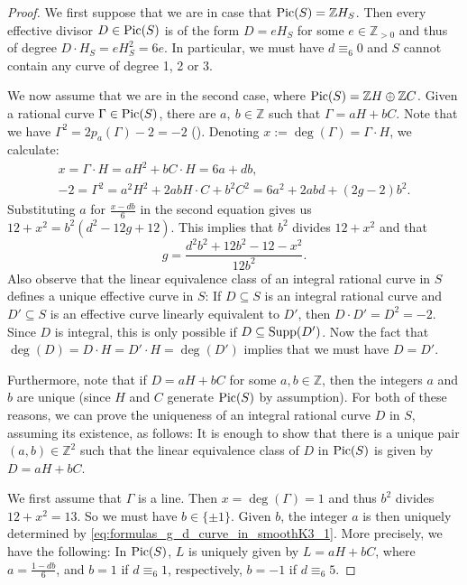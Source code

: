 \documentclass[english,11pt,reqno]{amsart}
\newcommand{\sub}{\subseteq}
\newcommand{\Z}{\mathbb{Z}}
\newcommand{\Pic}{\textup{Pic}}
\newcommand{\supp}{\textup{Supp}}
\begin{document}
%
\begin{proof}
We first suppose that we are in case that $\Pic(S)=\Z H_S$. Then every effective divisor $D\in\Pic(S)$ is of the form $D=eH_S$ for some $e\in \Z_{>0}$ and thus of degree $D\cdot H_S=eH_S^2=6e$. In particular, we must have $d\equiv_6 0$ and $S$ cannot contain any curve of degree 1, 2 or 3. \par 
We now assume that we are in the second case, where $\Pic(S)=\Z H\oplus \Z C$. Given a rational curve $\Gamma \in \Pic(S)$, there are $a,\:b\in \Z$ such that $\Gamma=aH+bC$. Note that we have $\Gamma^2 =2p_a(\Gamma)-2=-2$ (). Denoting $x:=\deg(\Gamma)=\Gamma\cdot H$, we calculate: 
\begin{gather*} \label{eq:formulas_g_d_curve_in_smoothK3_1}
x = \Gamma \cdot H = a H^2 + b C\cdot H = 6a + db, \tag{$\triangle_1$}\\
-2 = \Gamma^2 = a^2 H^2+ 2abH\cdot C + b^2 C^2= 6a^2 + 2abd + (2g-2)b^2. \nonumber
\end{gather*}
Substituting $a$ for $\frac{x-db}{6}$ in the second equation gives us
$12+x^2=b^2(d^2-12g+12)$. This implies that $ b^2$ divides $12+x^2$ and that \begin{equation} \label{eq:formulas_g_d_curve_in_smoothK3_2}
g =\frac{d^2b^2+12b^2-12-x^2}{12b^2}. \tag{$\triangle_2$}
\end{equation}
Also observe that the linear equivalence class of an integral rational curve in $S$ defines a unique effective curve in $S$: If $D\sub S$ is an integral rational curve and $D'\sub S$ is an effective curve linearly equivalent to $D'$, then $D\cdot D'=D^2=-2$. Since $D$ is integral, this is only possible if $D\sub \supp(D')$. Now the fact that $\deg(D)=D\cdot H=D'\cdot H=\deg(D')$ implies that we must have $D=D'$.   \par
Furthermore, note that if $D=aH+bC$ for some $a,b\in \Z$, then the integers $a$ and $b$ are unique (since $H$ and $C$ generate $\Pic(S)$ by assumption). For both of these reasons, we can prove the uniqueness of an integral rational curve $D$ in $S$, assuming its existence, as follows: It is enough to show that there is a unique pair $(a,b)\in \Z^2$ such that the linear equivalence class of $D$ in $\Pic(S)$ is given by $D=aH+bC$. \par 
We first assume that $\Gamma$ is a line. Then $x=\deg(\Gamma)=1$ and thus $b^2$ divides $12+x^2=13$. So we must have $b\in\{\pm1\}$. Given $b$, the integer $a$ is then uniquely determined by \eqref{eq:formulas_g_d_curve_in_smoothK3_1}. More precisely, we have the following: In $\Pic(S)$, $L$ is uniquely given by $L=aH+bC$, where $a=\frac{1-db}{6}$, and $b=1$ if $d\equiv_6 1$, respectively, $b=-1$ if $d\equiv_6 5$. \par 

\end{proof}
\end{document}
